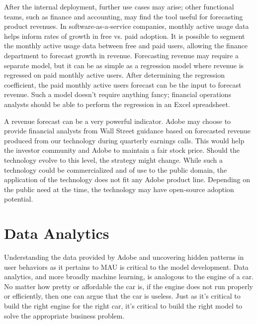\documentclass[11pt, oneside]{report}
\begin{document}
After the internal deployment, further use cases may arise; other functional teams, such as finance and accounting, may find the tool useful for forecasting product revenues. In software-as-a-service companies, monthly active usage data helps inform rates of growth in free vs. paid adoption. It is possible to segment the monthly active usage data between free and paid users, allowing the finance department to forecast growth in revenue. Forecasting revenue may require a separate model, but it can be as simple as a regression model where revenue is regressed on paid monthly active users. After determining the regression coefficient, the paid monthly active users forecast can be the input to forecast revenue. Such a model doesn't require anything fancy; financial operations analysts should be able to perform the regression in an Excel spreadsheet.

A revenue forecast can be a very powerful indicator. Adobe may choose to provide financial analysts from Wall Street guidance based on forecasted revenue produced from our technology during quarterly earnings calls. This would help the investor community and Adobe to maintain a fair stock price. Should the technology evolve to this level, the strategy might change. While such a technology could be commercialized and of use to the public domain, the application of the technology does not fit any Adobe product line. Depending on the public need at the time, the technology may have open-source adoption potential.

\section{Data Analytics}
Understanding the data provided by Adobe and uncovering hidden patterns in user behaviors as it pertains to MAU is critical to the model development. Data analytics, and more broadly machine learning, is analogous to the engine of a car.  No matter how pretty or affordable the car is, if the engine does not run properly or efficiently, then one can argue that the car is useless.  Just as it's critical to build the right engine for the right car, it's critical to build the right model to solve the appropriate business problem.
\end{document}
